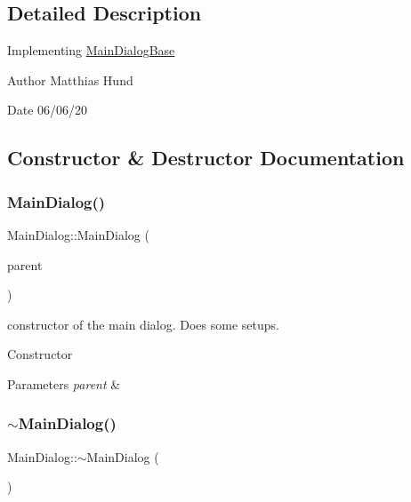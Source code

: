\subsection{Detailed Description}
Implementing \hyperlink{classMainDialogBase}{Main\+Dialog\+Base}

\begin{DoxyAuthor}{Author}
Matthias Hund 
\end{DoxyAuthor}
\begin{DoxyDate}{Date}
06/06/20 
\end{DoxyDate}


\subsection{Constructor \& Destructor Documentation}
\mbox{\label{classMainDialog_ae4bae8f15a5729712a7fd4effd078063}} 
\subsubsection{\texorpdfstring{Main\+Dialog()}{MainDialog()}}
{\footnotesize\ttfamily Main\+Dialog\+::\+Main\+Dialog (\begin{DoxyParamCaption}\item[{wx\+Window $\ast$}]{parent }\end{DoxyParamCaption})}



constructor of the main dialog. Does some setups. 

Constructor


\begin{DoxyParams}{Parameters}
{\em parent} & \\
\hline
\end{DoxyParams}
\mbox{\label{classMainDialog_a33d8e8327530b31387876b19f6542cc5}} 
\subsubsection{\texorpdfstring{$\sim$\+Main\+Dialog()}{~MainDialog()}}
{\footnotesize\ttfamily Main\+Dialog\+::$\sim$\+Main\+Dialog (\begin{DoxyParamCaption}{ }\end{DoxyParamCaption})}



